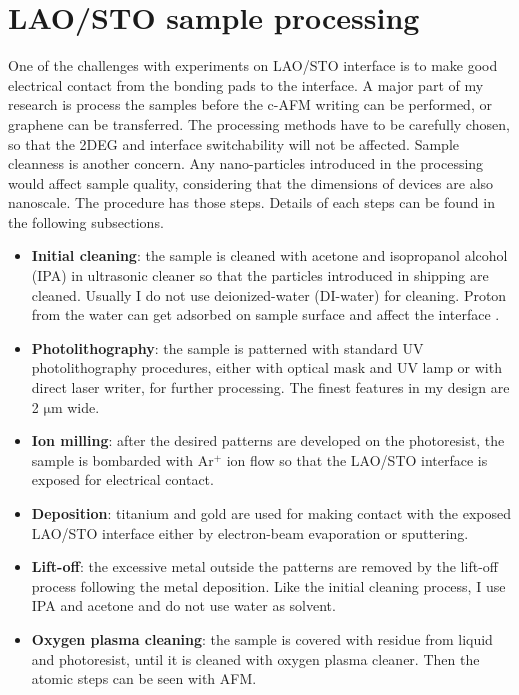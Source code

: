 \documentclass[pdflatex, sectionletters, 12pt]{pittetd}    %
\begin{document}
\section{LAO/STO sample processing}

One of the challenges with experiments on LAO/STO interface is to make good electrical contact from the bonding pads to the interface. A major part of my research is process the samples before the c-AFM writing can be performed, or graphene can be transferred. The processing methods have to be carefully chosen, so that the 2DEG and interface switchability will not be affected. Sample cleanness is another concern. Any nano-particles introduced in the processing would affect sample quality, considering that the dimensions of devices are also nanoscale. The procedure has those steps. Details of each steps can be found in the following subsections.

\begin{itemize}
	
	\item \textbf{Initial cleaning}: the sample is cleaned with acetone and isopropanol alcohol (IPA) in ultrasonic cleaner so that the particles introduced in shipping are cleaned. Usually I do not use deionized-water (DI-water) for cleaning. Proton from the water can get adsorbed on sample surface and affect the interface \cite{}.
	
	\item \textbf{Photolithography}: the sample is patterned with standard UV photolithography procedures, either with optical mask and UV lamp or with direct laser writer, for further processing. The finest features in my design are 2 $\mathrm{\mu}$m wide.
	
	\item \textbf{Ion milling}: after the desired patterns are developed on the photoresist, the sample is bombarded with Ar$^+$ ion flow so that the LAO/STO interface is exposed for electrical contact.
	
	\item \textbf{Deposition}: titanium and gold are used for making contact with the exposed LAO/STO interface either by electron-beam evaporation or sputtering.
	
	\item \textbf{Lift-off}: the excessive metal outside the patterns are removed by the lift-off process following the metal deposition. Like the initial cleaning process, I use IPA and acetone and do not use water as solvent.
	
	\item \textbf{Oxygen plasma cleaning}: the sample is covered with residue from liquid and photoresist, until it is cleaned with oxygen plasma cleaner. Then the atomic steps can be seen with AFM.
	
\end{itemize}
	
\end{document}
